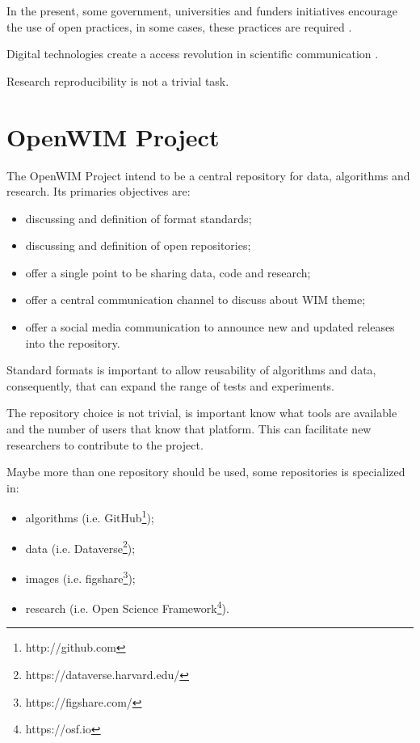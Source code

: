 \documentclass[a4paper]{article}
\begin{document}
{In the present, some government, universities and funders initiatives encourage the use of open practices, in some cases, these practices are required \cite{article:the-open-research-value-proposition}.

Digital technologies create a access revolution in scientific communication \cite{suber2012open}.

Research reproducibility is not a trivial task. \cite{open2015estimating}	

\section{OpenWIM Project}\label{open-wim}

The OpenWIM Project intend to be a central repository for data, algorithms and research. Its primaries objectives are:

\begin{itemize}
\item discussing and definition of format standards;
\item discussing and definition of open repositories;
\item offer a single point to be sharing data, code and research;
\item offer a central communication channel to discuss about WIM theme;
\item offer a social media communication to announce new and updated releases into the repository.
\end{itemize}

Standard formats is important to allow reusability of algorithms and data, consequently, that can expand the range of tests and experiments.

The repository choice is not trivial, is important know what tools are available and the number of users that know that platform. This can facilitate new researchers to contribute to the project.

Maybe more than one repository should be used, some repositories is specialized in:

\begin{itemize}
\item algorithms (i.e. GitHub\footnote{http://github.com});
\item data (i.e. Dataverse\footnote{https://dataverse.harvard.edu/});
\item images (i.e. figshare\footnote{https://figshare.com/});
\item research (i.e. Open Science Framework\footnote{https://osf.io}).
\end{itemize}

}
\end{document}
